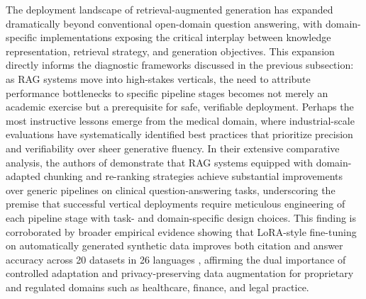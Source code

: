 \documentclass[11pt,a4paper]{article}
\begin{document}
The deployment landscape of retrieval-augmented generation has expanded dramatically beyond conventional open-domain question answering, with domain-specific implementations exposing the critical interplay between knowledge representation, retrieval strategy, and generation objectives. This expansion directly informs the diagnostic frameworks discussed in the previous subsection: as RAG systems move into high-stakes verticals, the need to attribute performance bottlenecks to specific pipeline stages becomes not merely an academic exercise but a prerequisite for safe, verifiable deployment. Perhaps the most instructive lessons emerge from the medical domain, where industrial-scale evaluations have systematically identified best practices that prioritize precision and verifiability over sheer generative fluency. In their extensive comparative analysis, the authors of \cite{arxiv:2602.03368v2} demonstrate that RAG systems equipped with domain-adapted chunking and re-ranking strategies achieve substantial improvements over generic pipelines on clinical question-answering tasks, underscoring the premise that successful vertical deployments require meticulous engineering of each pipeline stage with task- and domain-specific design choices. This finding is corroborated by broader empirical evidence showing that LoRA-style fine-tuning on automatically generated synthetic data improves both citation and answer accuracy across 20 datasets in 26 languages \cite{arxiv:2501.11929v1}, affirming the dual importance of controlled adaptation and privacy-preserving data augmentation for proprietary and regulated domains such as healthcare, finance, and legal practice.
\end{document}
